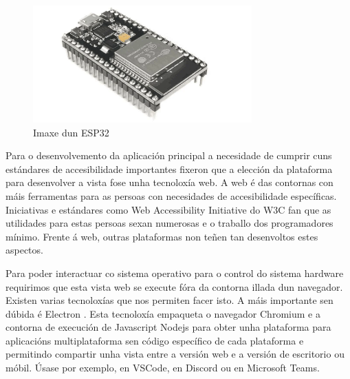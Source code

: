 \begin{figure}[hp!]
  \centering
  \includegraphics[width=0.75\textwidth]{imaxes/ESP32.png}
  \caption{Imaxe dun ESP32}
  \label{fig:esp32}
\end{figure}

\newline{}\newline{}
Para o desenvolvemento da aplicación principal a necesidade de cumprir cuns estándares de accesibilidade importantes fixeron que a elección da plataforma para desenvolver a vista fose unha tecnoloxía web. A web é das contornas con máis ferramentas para as persoas con necesidades de accesibilidade específicas. Iniciativas e estándares como Web Accessibility Initiative \cite{WAI} do W3C fan que as utilidades para estas persoas sexan numerosas e o traballo dos programadores mínimo. Frente á web, outras plataformas non teñen tan desenvoltos estes aspectos.

Para poder interactuar co sistema operativo para o control do sistema hardware requirimos que esta vista web se execute fóra da contorna illada dun navegador. Existen varias tecnoloxías que nos permiten facer isto. A máis importante sen dúbida é Electron \cite{Electron}. Esta tecnoloxía empaqueta o navegador Chromium e a contorna de execución de Javascript Nodejs para obter unha plataforma para aplicacións multiplataforma sen código específico de cada plataforma e permitindo compartir unha vista entre a versión web e a versión de escritorio ou móbil. Úsase por exemplo, en VSCode, en Discord ou en Microsoft Teams. 

